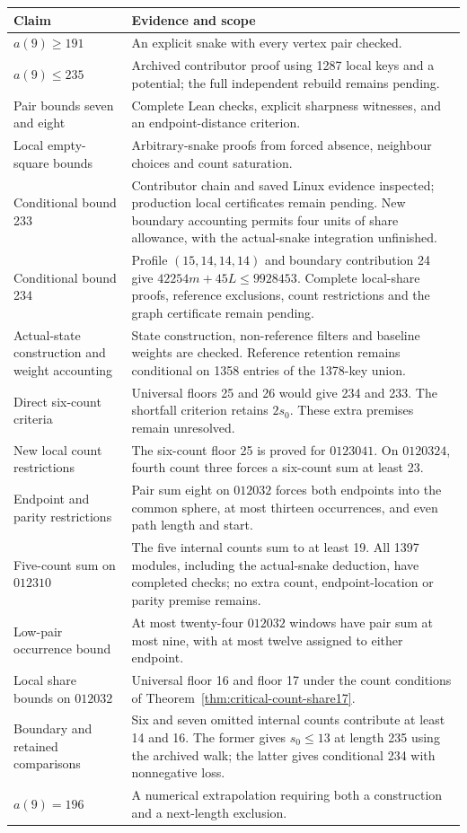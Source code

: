 \documentclass[11pt,a4paper]{article}
\theoremstyle{definition}
\theoremstyle{remark}
\begin{document}
\begin{center}
\begin{tabular}{p{}p{}}
\toprule
Claim & Evidence and scope\\\midrule
$a(9)\ge191$ & An explicit snake with every vertex pair checked.\\
$a(9)\le235$ & Archived contributor proof using 1287 local keys and a potential; the full independent rebuild remains pending.\\
Pair bounds seven and eight & Complete Lean checks, explicit sharpness witnesses, and an endpoint-distance criterion.\\
Local empty-square bounds & Arbitrary-snake proofs from forced absence, neighbour choices and count saturation.\\
Conditional bound 233 & Contributor chain and saved Linux evidence inspected; production local certificates remain pending. New boundary accounting permits four units of share allowance, with the actual-snake integration unfinished.\\
Conditional bound 234 & Profile $(15,14,14,14)$ and boundary contribution 24 give $42254m+45L\le9928453$. Complete local-share proofs, reference exclusions, count restrictions and the graph certificate remain pending.\\
Actual-state construction and weight accounting & State construction, non-reference filters and baseline weights are checked. Reference retention remains conditional on 1358 entries of the 1378-key union.\\
Direct six-count criteria & Universal floors 25 and 26 would give 234 and 233. The shortfall criterion retains $2s_0$. These extra premises remain unresolved.\\
New local count restrictions & The six-count floor 25 is proved for $0123041$. On $0120324$, fourth count three forces a six-count sum at least 23.\\
Endpoint and parity restrictions & Pair sum eight on $012032$ forces both endpoints into the common sphere, at most thirteen occurrences, and even path length and start.\\
Five-count sum on $012310$ & The five internal counts sum to at least 19. All 1397 modules, including the actual-snake deduction, have completed checks; no extra count, endpoint-location or parity premise remains.\\
Low-pair occurrence bound & At most twenty-four $012032$ windows have pair sum at most nine, with at most twelve assigned to either endpoint.\\
Local share bounds on $012032$ & Universal floor 16 and floor 17 under the count conditions of Theorem~\ref{thm:critical-count-share17}.\\
Boundary and retained comparisons & Six and seven omitted internal counts contribute at least 14 and 16. The former gives $s_0\le13$ at length 235 using the archived walk; the latter gives conditional 234 with nonnegative loss.\\
$a(9)=196$ & A numerical extrapolation requiring both a construction and a next-length exclusion.\\
\bottomrule
\end{tabular}
\end{center}
\end{document}
